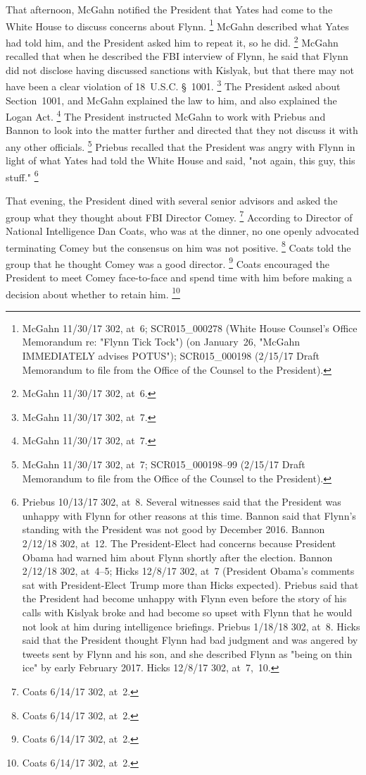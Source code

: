 That afternoon, McGahn notified the President that Yates had come to the White House to discuss concerns about Flynn.%
\footnote{McGahn 11/30/17 302, at~6;
SCR015\_000278 (White House Counsel's Office Memorandum re: "Flynn Tick Tock") (on January~26, "McGahn IMMEDIATELY advises POTUS");
SCR015\_000198 (2/15/17 Draft Memorandum to file from the Office of the Counsel to the President).}
McGahn described what Yates had told him, and the President asked him to repeat it, so he did.%
\footnote{McGahn 11/30/17 302, at~6.}
McGahn recalled that when he described the FBI interview of Flynn, he said that Flynn did not disclose having discussed sanctions with Kislyak, but that there may not have been a clear violation of 18~U.S.C. \S~1001.%
\footnote{McGahn 11/30/17 302, at~7.}
The President asked about Section~1001, and McGahn explained the law to him, and also explained the Logan Act.%
\footnote{McGahn 11/30/17 302, at~7.}
The President instructed McGahn to work with Priebus and Bannon to look into the matter further and directed that they not discuss it with any other officials.%
\footnote{McGahn 11/30/17 302, at~7;
SCR015\_000198--99 (2/15/17 Draft Memorandum to file from the Office of the Counsel to the President).}
Priebus recalled that the President was angry with Flynn in light of what Yates had told the White House and said, "not again, this guy, this stuff."%
\footnote{Priebus 10/13/17 302, at~8.
Several witnesses said that the President was unhappy with Flynn for other reasons at this time.
Bannon said that Flynn's standing with the President was not good by December 2016.
Bannon 2/12/18 302, at~12.
The President-Elect had concerns because President Obama had warned him about Flynn shortly after the election.
Bannon 2/12/18 302, at~4--5;
Hicks 12/8/17 302, at~7 (President Obama's comments sat with President-Elect Trump more than Hicks expected).
Priebus said that the President had become unhappy with Flynn even before the story of his calls with Kislyak broke and had become so upset with Flynn that he would not look at him during intelligence briefings.
Priebus 1/18/18 302, at~8.
Hicks said that the President thought Flynn had bad judgment and was angered by tweets sent by Flynn and his son, and she described Flynn as "being on thin ice" by early February 2017.
Hicks 12/8/17 302, at~7,~10.}

That evening, the President dined with several senior advisors and asked the group what they thought about FBI Director Comey.%
\footnote{Coats 6/14/17 302, at~2.}
According to Director of National Intelligence Dan Coats, who was at the dinner, no one openly advocated terminating Comey but the consensus on him was not positive.%
\footnote{Coats 6/14/17 302, at~2.}
Coats told the group that he thought Comey was a good director.%
\footnote{Coats 6/14/17 302, at~2.}
Coats encouraged the President to meet Comey face-to-face and spend time with him before making a decision about whether to retain him.%
\footnote{Coats 6/14/17 302, at~2.}

